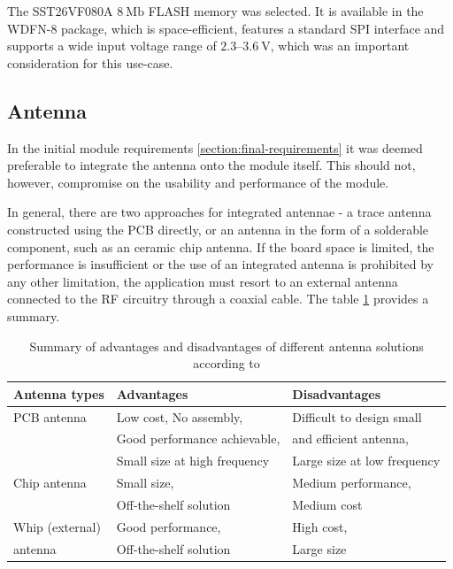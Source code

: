 The SST26VF080A $8~\mathrm{Mb}$ FLASH memory was selected. It is available in the WDFN-8 package, which is space-efficient, features a standard SPI interface and supports a wide input voltage range of $2.3\text{--}3.6~\mathrm{V}$, which was an important consideration for this use-case.

\subsection{\label{section:antenna}Antenna}
In the initial module requirements \ref{section:final-requirements} it was deemed preferable to integrate the antenna onto the module itself. This should not, however, compromise on the usability and performance of the module. 

In general, there are two approaches for integrated antennae - a trace antenna constructed using the PCB directly, or an antenna in the form of a solderable component, such as an ceramic chip antenna. If the board space is limited, the performance is insufficient or the use of an integrated antenna is prohibited by any other limitation, the application must resort to an external antenna connected to the RF circuitry through a coaxial cable. The table \ref{table:antenna-solutions} provides a summary.

\begin{table}[H]
\begin{center}
\caption{\label{table:antenna-solutions}Summary of advantages and disadvantages of different antenna solutions according to \cite{andersen_selecting_2008}}
    \begin{tabular}{|l|l|l|}
    \hline
    \textbf{Antenna types} & \textbf{Advantages} & \textbf{Disadvantages} \\
    \hline
    PCB antenna  & Low cost, No assembly,        & Difficult to design small \\
                 & Good performance achievable,  & and efficient antenna, \\
                 & Small size at high frequency  & Large size at low frequency \\
    \hline
    Chip antenna & Small size,                   & Medium performance, \\
                 & Off-the-shelf solution        & Medium cost \\
    \hline
    Whip (external)& Good performance,           & High cost, \\
    antenna        & Off-the-shelf solution      & Large size \\
    \hline
    \end{tabular}
\end{center}
\end{table}

